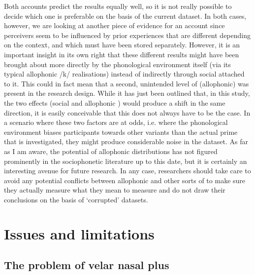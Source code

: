 Both accounts predict the results equally well, so it is not really possible to decide which one is preferable on the basis of the current dataset.
In both cases, however, we are looking at another piece of evidence for an  account since perceivers seem to be influenced by prior experiences that are different depending on the context, and which must have been stored separately.
However, it is an important insight in its own right that these different results might have been brought about more directly by the phonological environment itself (via its typical allophonic /k/ realisations) instead of indirectly through social  attached to it.
This could in fact mean that a second, unintended level of (allophonic)  was present in the research design.
While it has just been outlined that, in this study, the two effects (social  and allophonic ) would produce a shift in the same direction, it is easily conceivable that this does not always have to be the case.
In a scenario where these two factors are at odds, i.e. where the phonological environment biases participants towards other variants than the actual prime that is investigated, they might produce considerable noise in the dataset.
As far as I am aware, the  potential of allophonic distributions has not figured prominently in the sociophonetic literature up to this date, but it is certainly an interesting avenue for future research.
In any case, researchers should take care to avoid any potential conflicts between allophonic and other sorts of  to make sure they actually measure what they mean to measure and do not draw their conclusions on the basis of `corrupted' datasets.

	\section{Issues and limitations}
		\label{sec.perc_res.disc.issues}

		\subsection{The problem of velar nasal plus}

